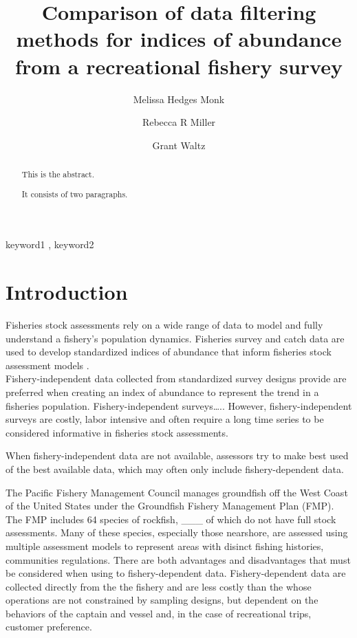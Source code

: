 \documentclass[preprint, 3p,
authoryear]{elsarticle} %
\begin{document}
\begin{frontmatter}

  \title{Comparison of data filtering methods for indices of abundance
from a recreational fishery survey}
    \author[SWFSC]{Melissa Hedges Monk}
    \author[UCSC]{Rebecca R Miller}
    \author[UCSC]{Grant Waltz}
  
  \begin{abstract}
  This is the abstract.

  It consists of two paragraphs.
  \end{abstract}
    \begin{keyword}
    keyword1 \sep 
    keyword2
  \end{keyword}
  
 \end{frontmatter}

\hypertarget{introduction}{%
\section{Introduction}\label{introduction}}

Fisheries stock assessments rely on a wide range of data to model and
fully understand a fishery's population dynamics. Fisheries survey and
catch data are used to develop standardized indices of abundance that
inform fisheries stock assessment models \citep{Maunder2004}.\\
Fishery-independent data collected from standardized survey designs
provide are preferred when creating an index of abundance to represent
the trend in a fisheries population. Fishery-independent surveys\ldots..
However, fishery-independent surveys are costly, labor intensive and
often require a long time series to be considered informative in
fisheries stock assessments.

When fishery-independent data are not available, assessors try to make
best used of the best available data, which may often only include
fishery-dependent data.

The Pacific Fishery Management Council manages groundfish off the West
Coast of the United States under the Groundfish Fishery Management Plan
(FMP). The FMP includes 64 species of rockfish, \_\_\_ of which do not
have full stock assessments. Many of these species, especially those
nearshore, are assessed using multiple assessment models to represent
areas with disinct fishing histories, communities regulations. There are
both advantages and disadvantages that must be considered when using to
fishery-dependent data. Fishery-dependent data are collected directly
from the the fishery and are less costly than the whose operations are
not constrained by sampling designs, but dependent on the behaviors of
the captain and vessel and, in the case of recreational trips, customer
preference.
\end{document}

